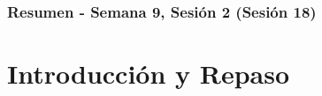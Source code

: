 \documentclass[10pt]{beamer}
\begin{document}
\myfront{}

\begin{frame}
  \titlepage
\end{frame}

\begin{frame}
  \frametitle{Resumen - Semana 9, Sesión 2 (Sesión 18)}
  \tableofcontents
\end{frame}


\section{Introducción y Repaso}
\end{document}
